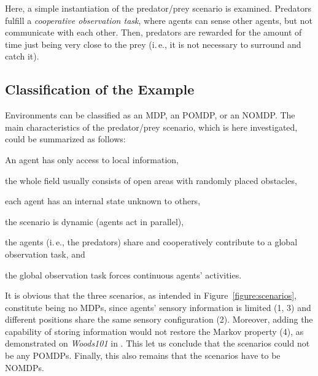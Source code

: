 Here, a simple instantiation of the predator/prey scenario is examined. 
Predators fulfill a \emph{cooperative observation task}, where agents can sense other agents, but not communicate with each other. Then, predators are rewarded for the amount of time just being very close to the prey (i.\,e., it is not necessary to surround and catch it). 

\subsection{Classification of the Example}
\label{subsection:scenario-classification}

Environments can be classified as an MDP, an POMDP, or an NOMDP. The main characteristics of the predator/prey scenario, which is here investigated, could be summarized as follows:

\begin{enumerate*}
	\item An agent has only access to local information,
	\item the whole field usually consists of open areas with randomly placed obstacles,
	\item each agent has an internal state unknown to others,
	\item the scenario is dynamic (agents act in parallel),
	\item the agents (i.\,e., the predators) share and cooperatively contribute to a glo\-bal observation task, and
	\item the global observation task forces continuous agents' activities.  
\end{enumerate*}

It is obvious that the three scenarios, as intended in Figure~\ref{figure:scenarios}, constitute being no MDPs, since agents' sensory information is limited (1, 3) and different positions share the same sensory configuration (2). Moreover, adding the capability of storing information would not restore the Markov property (4), as demonstrated on \emph{Woods101} in \cite{Lan98,LW00}. This let us conclude that the scenarios could not be any POMDPs. Finally, this also remains that the scenarios have to be NOMDPs. 

